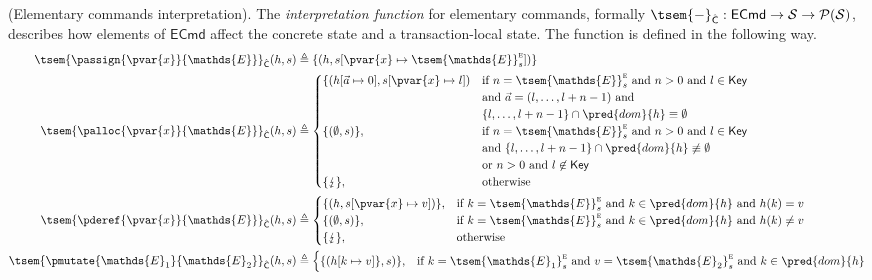 \begin{defn}
	(Elementary commands interpretation).
	\label{ecmdint} The \emph{interpretation function} for elementary commands, formally $\tsem{-}_{\hat{\mathsf{C}}} : \mathsf{ECmd} \rightarrow \mathcal{S} \rightarrow \mathcal{P}(\mathcal{S})$, describes how elements of $\mathsf{ECmd}$ affect the concrete state and a transaction-local state. The function is defined in the following way.
	\begin{align*}
		\tsem{\passign{\pvar{x}}{\mathds{E}}}_{\hat{\mathsf{C}}}(h, s) &\triangleq \{ (h, s[\pvar{x} \mapsto \tsem{\mathds{E}}_s^\textsc{e}]) \}
		\\
		\tsem{\palloc{\pvar{x}}{\mathds{E}}}_{\hat{\mathsf{C}}}(h, s) &\triangleq
			\begin{cases}
				\{ (h[\vec{a} \mapsto 0], s[\pvar{x} \mapsto l])
				&
				\text{if } n = \tsem{\mathds{E}}_s^\textsc{e} \text{ and } n > 0 \text{ and } l \in \mathsf{Key}\\ & \text{and } \vec{a} = (l, \ldots, l + n - 1) \text{ and } \\
				& \{ l, \ldots, l + n - 1 \} \cap \pred{dom}{h} \equiv \emptyset \\
				\{(\emptyset, s)\}, & \text{if } n = \tsem{\mathds{E}}_s^\textsc{e} \text{ and } n > 0 \text{ and } l \in \mathsf{Key} \\ & \text{and } \{ l, \ldots, l + n - 1 \} \cap \pred{dom}{h} \not\equiv \emptyset \\
				& \text{or } n > 0 \text{ and } l \not\in \mathsf{Key} \\
				\{ \lightning \}, & \text{otherwise}
			\end{cases}
		\\
		\tsem{\pderef{\pvar{x}}{\mathds{E}}}_{\hat{\mathsf{C}}}(h, s) &\triangleq
			\begin{cases}
				\{ (h, s[\pvar{x} \mapsto v]) \}, & \text{if } k = \tsem{\mathds{E}}_s^\textsc{e} \text{ and } k \in \pred{dom}{h} \text{ and } h(k) = v \\
				\{ (\emptyset, s) \}, & \text{if } k = \tsem{\mathds{E}}_s^\textsc{e} \text{ and } k \in \pred{dom}{h} \text{ and } h(k) \neq v \\
				\{ \lightning \}, & \text{otherwise}
			\end{cases}
		\\
		\tsem{\pmutate{\mathds{E}_1}{\mathds{E}_2}}_{\hat{\mathsf{C}}}(h, s) &\triangleq
		\begin{cases}
			\{ (h[k \mapsto v] \}, s) \}, & \text{if } k = \tsem{\mathds{E}_1}_s^\textsc{e} \text{ and } v = \tsem{\mathds{E}_2}_s^\textsc{e} \text{ and } k \in \pred{dom}{h} \\

\end{cases}
\end{align*}
\end{defn}

